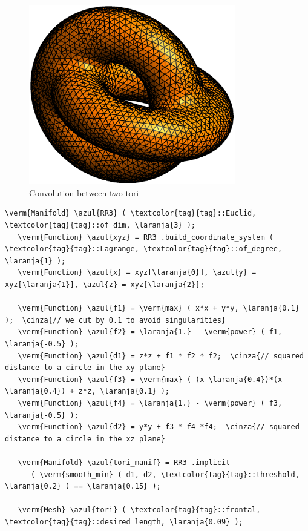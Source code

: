 \begin{figure}[ht] \centering
 \includegraphics[width=90mm]{two-tori}
  \caption{Convolution between two tori}
\end{figure}

\begin{Verbatim}[commandchars=\\\{\},formatcom=\small\tt,frame=single,
   label=parag-\ref{\numb section 3.\numb parag 7}.cpp,rulecolor=\color{moldura},
   baselinestretch=0.94,framesep=2mm                                            ]
   \verm{Manifold} \azul{RR3} ( \textcolor{tag}{tag}::Euclid, \textcolor{tag}{tag}::of_dim, \laranja{3} );
   \verm{Function} \azul{xyz} = RR3 .build_coordinate_system ( \textcolor{tag}{tag}::Lagrange, \textcolor{tag}{tag}::of_degree, \laranja{1} );
   \verm{Function} \azul{x} = xyz[\laranja{0}], \azul{y} = xyz[\laranja{1}], \azul{z} = xyz[\laranja{2}];

   \verm{Function} \azul{f1} = \verm{max} ( x*x + y*y, \laranja{0.1} );  \cinza{// we cut by 0.1 to avoid singularities}
   \verm{Function} \azul{f2} = \laranja{1.} - \verm{power} ( f1, \laranja{-0.5} );
   \verm{Function} \azul{d1} = z*z + f1 * f2 * f2;  \cinza{// squared distance to a circle in the xy plane}
   \verm{Function} \azul{f3} = \verm{max} ( (x-\laranja{0.4})*(x-\laranja{0.4}) + z*z, \laranja{0.1} );
   \verm{Function} \azul{f4} = \laranja{1.} - \verm{power} ( f3, \laranja{-0.5} );
   \verm{Function} \azul{d2} = y*y + f3 * f4 *f4;  \cinza{// squared distance to a circle in the xz plane}

   \verm{Manifold} \azul{tori_manif} = RR3 .implicit
      ( \verm{smooth_min} ( d1, d2, \textcolor{tag}{tag}::threshold, \laranja{0.2} ) == \laranja{0.15} );

   \verm{Mesh} \azul{tori} ( \textcolor{tag}{tag}::frontal, \textcolor{tag}{tag}::desired_length, \laranja{0.09} );
\end{Verbatim}

